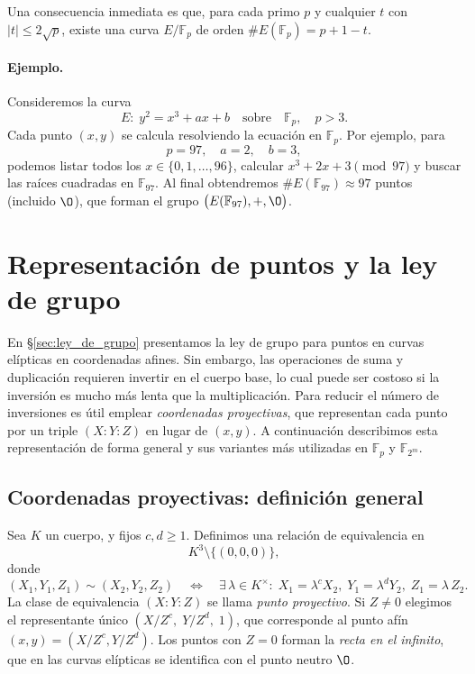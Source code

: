 Una consecuencia inmediata es que, para cada primo \(p\) y cualquier \(t\) con \(|t|\le2\sqrt p\), existe una curva \(E/\mathbb{F}_p\) de orden \(\#E(\mathbb{F}_p)=p+1-t\).

\paragraph{Ejemplo.}
Consideremos la curva
\[
  E\colon\;y^2 = x^3 + a x + b
  \quad\text{sobre}\quad
  \mathbb{F}_{p},\quad p>3.
\]
Cada punto \((x,y)\) se calcula resolviendo la ecuación en \(\mathbb{F}_p\). Por ejemplo, para
\[
  p = 97,\quad a=2,\quad b=3,
\]
podemos listar todos los \(x\in\{0,1,\dots,96\}\), calcular \(x^3+2x+3\pmod{97}\) y buscar las raíces cuadradas en \(\mathbb{F}_{97}\). Al final obtendremos \(\#E(\mathbb{F}_{97})\approx97\) puntos (incluido \(\O\)), que forman el grupo \(\bigl(E(\mathbb{F}_{97}),+,\O\bigr)\).

\section{Representación de puntos y la ley de grupo}\label{sec:representacion_puntos}
En \S\ref{sec:ley_de_grupo} presentamos la ley de grupo para puntos en curvas elípticas en coordenadas afines. Sin embargo, las operaciones de suma y duplicación requieren invertir en el cuerpo base, lo cual puede ser costoso si la inversión es mucho más lenta que la multiplicación. Para reducir el número de inversiones es útil emplear \emph{coordenadas proyectivas}, que representan cada punto por un triple \((X:Y:Z)\) en lugar de \((x,y)\). A continuación describimos esta representación de forma general y sus variantes más utilizadas en \(\mathbb{F}_p\) y \(\mathbb{F}_{2^m}\).

\subsection{Coordenadas proyectivas: definición general}

Sea \(K\) un cuerpo, y fijos \(c,d\ge1\). Definimos una relación de equivalencia en
\[
  K^3 \setminus \{(0,0,0)\},
\]
donde
\[
  (X_1,Y_1,Z_1)\sim (X_2,Y_2,Z_2)
  \quad\Longleftrightarrow\quad
  \exists\,\lambda\in K^\times:
    \;X_1=\lambda^cX_2,\;
    Y_1=\lambda^dY_2,\;
    Z_1=\lambda\,Z_2.
\]
La clase de equivalencia \((X:Y:Z)\) se llama \emph{punto proyectivo}. Si \(Z\neq0\) elegimos el representante único \((X/Z^c,\;Y/Z^d,\;1)\), que corresponde al punto afín \((x,y)=(X/Z^c,Y/Z^d)\). Los puntos con \(Z=0\) forman la \emph{recta en el infinito}, que en las curvas elípticas se identifica con el punto neutro \(\O\).


